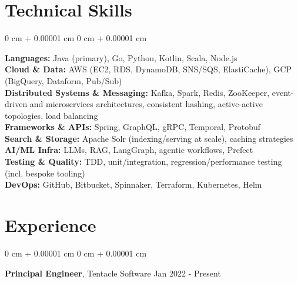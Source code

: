 \documentclass[10pt, letterpaper]{article}
\newif\ifAustralia
\newenvironment{onecolentry}{
    \begin{adjustwidth}{
        0 cm + 0.00001 cm
    }{
        0 cm + 0.00001 cm
    }
}{
    \end{adjustwidth}
} %
\newenvironment{twocolentry}[2][]{
    \onecolentry
    \def\secondColumn{#2}
    \setcolumnwidth{\fill, 4.5 cm}
    \begin{paracol}{2}
}{
    \switchcolumn \raggedleft \secondColumn
    \end{paracol}
    \endonecolentry
} %
\begin{document}
    \section{Technical Skills}
        \begin{onecolentry}
            \textbf{Languages:} Java (primary), Go, Python, Kotlin, Scala, Node.js \\
            \textbf{Cloud \& Data:} AWS (EC2, RDS, DynamoDB, SNS/SQS, ElastiCache), GCP (BigQuery, Dataform, Pub/Sub) \\
            \textbf{Distributed Systems \& Messaging:} Kafka, Spark, Redis, ZooKeeper, event-driven and microservices architectures, consistent hashing, active-active topologies, load balancing \\
            \textbf{Frameworks \& APIs:} Spring, GraphQL, gRPC, Temporal, Protobuf \\
            \textbf{Search \& Storage:} Apache Solr (indexing/serving at scale), caching strategies \\
            \textbf{AI/ML Infra:} LLMs, RAG, LangGraph, agentic workflows, Prefect \\
            \textbf{Testing \& Quality:} TDD, unit/integration, regression/performance testing (incl. bespoke tooling) \\
            \textbf{DevOps:} GitHub, Bitbucket, Spinnaker, Terraform, Kubernetes, Helm \\
        \end{onecolentry}
    
    \ifAustralia
        \newpage
    \fi
    \section{Experience}
        \vspace{0.15 cm}
        \begin{twocolentry}{
            Jan 2022 - Present
        }
        \textbf{Principal Engineer}, Tentacle Software\end{twocolentry}
\end{document}

